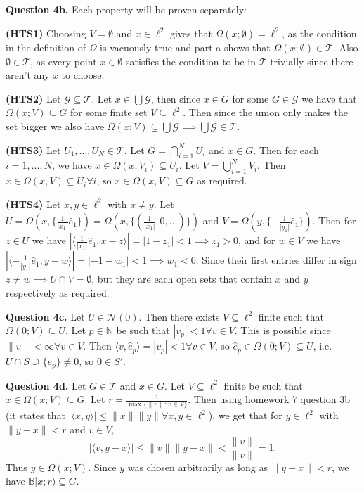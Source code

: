 \documentclass[letterpaper, reqno,11pt]{article}
\begin{document}
{\medskip\noindent\bf Question 4b.} Each property will be proven separately:

{\medskip\noindent\bf (HTS1)} Choosing $V=\emptyset$ and $x\in \ell^2$ gives that $\Omega(x;\emptyset)=\ell^2$, as the condition in the definition of $\Omega$ is vacuously true and part a shows that $\Omega(x;\emptyset)\in\mathcal T$. Also $\emptyset\in \mathcal T$, as every point $x\in\emptyset$ satisfies the condition to be in $\mathcal T$ trivially since there aren't any $x$ to choose.

{\medskip\noindent\bf (HTS2)} Let $\mathcal G\subseteq\mathcal T$. Let $x\in\bigcup\mathcal G$, then since $x\in G$ for some $G\in \mathcal G$ we have that $\Omega(x;V)\subseteq G$ for some finite set $V\subseteq \ell^2$. Then since the union only makes the set bigger we also have $\Omega(x;V)\subseteq\bigcup \mathcal G\implies \bigcup \mathcal G\in\mathcal T$.

{\medskip\noindent\bf (HTS3)} Let $U_1,\ldots,U_N\in\mathcal T$. Let $G=\bigcap_{i=1}^{N} U_i$ and $x\in G$. Then for each $i=1,\ldots,N$, we have $x\in\Omega(x;V_i)\subseteq U_i$. Let $V=\bigcup_{i=1}^{N}V_i$. Then $x\in\Omega(x,V)\subseteq U_i\forall i$, so $x\in\Omega(x,V)\subseteq G$ as required.

{\medskip\noindent\bf (HTS4)} Let $x,y\in\ell^2$ with $x\neq y$. Let $U=\Omega(x,\{\frac{1}{|x_1|}\hat e_1\})=\Omega(x,\{(\frac{1}{|x_1|},0,\ldots)\})$ and $V=\Omega(y,\{-\frac{1}{|y_1|}\hat e_1\})$. Then for $z\in U$ we have $|\langle \frac{1}{|x_1|}\hat e_1,x-z\rangle|=|1-z_1|<1\implies z_1>0$, and for $w\in V$ we have $|\langle -\frac{1}{|y_1|}\hat e_1,y-w\rangle|=|-1-w_1|<1\implies w_1<0$. Since their first entries differ in sign $z\neq w\implies U\cap V=\emptyset$, but they are each open sets that contain $x$ and $y$ respectively as required.

{\medskip\noindent\bf Question 4c.} Let $U\in \mathcal N(0)$. Then there exists $V\subseteq \ell^2$ finite such that $\Omega(0;V)\subseteq U$. Let $p\in \mathbb{N}$ be such that $|v_p|<1\forall v\in V$. This is possible since $\|v\|<\infty\forall v\in V$. Then $\langle v,\hat e_p\rangle=|v_p|<1\forall v\in V$, so $\hat e_p\in\Omega(0;V)\subseteq U$, i.e. $U\cap S\supseteq \{e_p\}\neq 0$, so $0\in S'$.

{\medskip\noindent\bf Question 4d.} Let $G\in\mathcal T$ and $x\in G$. Let $V\subseteq \ell^2$ finite be such that $x\in\Omega(x;V)\subseteq G$. Let $r=\frac{1}{\max \{\|v\|: v\in V\}}$. Then using homework 7 question 3b (it states that $|\langle x,y\rangle|\leq \|x\|\|y\|\forall x,y\in\ell^2$), we get that for $y\in \ell^2$ with $\|y-x\|<r$ and $v\in V$,
\[
|\langle v,y-x\rangle|\leq \|v\| \|y-x\|<\frac{\|v\|}{\|v\|}=1
.\]
Thus $y\in\Omega(x;V)$. Since $y$ was chosen arbitrarily as long as $\|y-x\|<r$, we have $\mathbb B[x;r)\subseteq G$.
\end{document}
